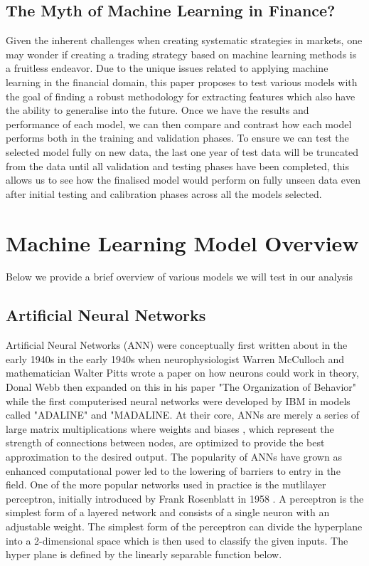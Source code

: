 \documentclass[12pt, a4paper]{article}
\begin{document}
\subsection{The Myth of Machine Learning in Finance?}
Given the inherent challenges when creating systematic strategies in markets, one may wonder if creating a trading strategy based on machine learning methods is a fruitless endeavor.
\newline Due to the unique issues related to applying machine learning in the financial domain, this paper proposes to test various models with the goal of finding a robust methodology for extracting features which also have the ability to generalise into the future. Once we have the results and performance of each model, we can then compare and contrast how each model performs both in the training and validation phases. \newline To ensure we can test the selected model fully  on new data, the last one year of test data will be truncated from the data until all validation and testing phases have been completed, this allows us to see how the finalised model would perform on fully unseen data even after initial testing and calibration phases across all the models selected.

\section{Machine Learning Model Overview}
 Below we provide a brief overview of various models we will test in our analysis

\subsection{Artificial Neural Networks}
Artificial Neural Networks (ANN) were conceptually first written about in the early 1940s \cite{Widrow1990} in the early 1940s when neurophysiologist Warren McCulloch and mathematician Walter Pitts wrote a paper on how neurons could work in theory, Donal Webb then expanded on this in his paper "The Organization of Behavior" while the first computerised neural networks were developed by IBM in models called "ADALINE" and "MADALINE. At their core, ANNs are merely a series of large matrix multiplications where weights and biases , which represent the strength of connections between nodes, are optimized to provide the best approximation to the desired output. The popularity of ANNs have grown as enhanced computational power led to the lowering of barriers to entry in the field. One of the more popular networks used in practice is the mutlilayer perceptron, initially introduced by Frank Rosenblatt in 1958 \cite{Rosenblatt1958}. A perceptron is the simplest form of a layered network and consists of a single neuron with an adjustable weight. The simplest form of the perceptron can divide the hyperplane into a 2-dimensional space which is then used to classify the given inputs. The hyper plane is defined by the linearly separable function below.
\end{document}
